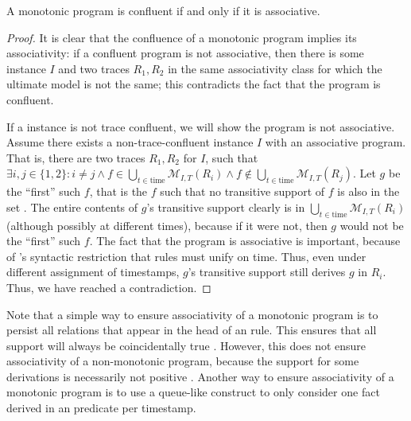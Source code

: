 \begin{lemma}
%
A monotonic \lang program is confluent if and only if it is associative.
%
\end{lemma}
%
\begin{proof}
%
It is clear that the confluence of a monotonic \lang program implies its
associativity: if a confluent \lang program is not associative, then there is
some instance $I$ and two traces $R_1, R_2$ in the same associativity class for
which the ultimate model is not the same; this contradicts the fact that the
program is confluent.

If a \lang instance is not trace confluent, we will show the \lang program is
not associative.  Assume there exists a non-trace-confluent \lang instance $I$
with an associative program.  
That is, there are two traces $R_1, R_2$ for $I$,
such that 
$\exists i,j \in \{1,2\}: i \neq j \land f \in \bigcup_{t \in \text{time}}
\mathcal{M}_{I,T}(R_i) \land f \not\in \bigcup_{t \in \text{time}}
\mathcal{M}_{I,T}(R_j)$.  
Let $g$ be the ``first'' such $f$, that is the $f$
such that no transitive support of $f$ is also in the set .  The entire contents of $g$'s transitive
support clearly is in $\bigcup_{t \in \text{time}} \mathcal{M}_{I,T}(R_i)$
 (although possibly at different times), because if it were not,
then $g$ would not be the ``first'' such $f$.  The fact that the program is
associative is important, because of \lang's syntactic restriction that rules
must unify on time.  Thus, even under different assignment of timestamps, $g$'s
transitive support still derives $g$ in $R_i$.  Thus, we have reached a
contradiction.  
%
\end{proof}

Note that a simple way to ensure associativity of a monotonic program is to
persist all relations that appear in the head of an  rule.  
This ensures that all support will always be coincidentally true .  However,
this does not ensure associativity of a non-monotonic program, because the
support for some derivations is necessarily not positive .  
Another way to ensure associativity of a monotonic program is to use a
queue-like construct to only consider one fact derived in an 
predicate per timestamp.  

